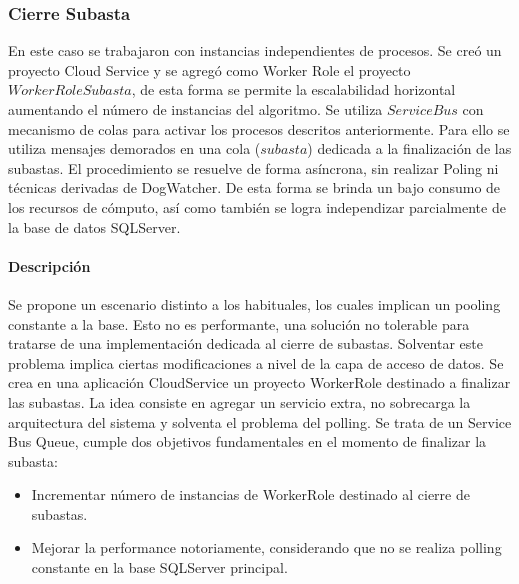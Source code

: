 \documentclass[journal]{IEEEtran}
\begin{document}
\subsubsection{Cierre Subasta}
\label{sec:cierresubasta}
En este caso se trabajaron con instancias independientes de procesos. Se creó un proyecto Cloud Service y se agregó como Worker Role el proyecto $WorkerRoleSubasta$, de esta forma se permite la escalabilidad horizontal aumentando el número de instancias del algoritmo. Se utiliza $Service Bus$ \cite{url:servicebus} con mecanismo de colas para activar los procesos descritos anteriormente. Para ello se utiliza mensajes demorados en una cola ($subasta$) dedicada a la finalización de las subastas. El procedimiento se resuelve de forma asíncrona, sin realizar Poling ni técnicas derivadas de DogWatcher. De esta forma se brinda un bajo consumo de los recursos de cómputo, así como también se logra independizar parcialmente de la base de datos SQLServer.

\paragraph{Descripción}
Se propone un escenario distinto a los habituales, los cuales implican un pooling constante a la base. Esto no es performante, una solución no tolerable para tratarse de una implementación dedicada al cierre de subastas.
Solventar este problema implica ciertas modificaciones a nivel de la capa de acceso de datos. Se crea en una aplicación CloudService \cite{url:cloudservice} un proyecto WorkerRole destinado a finalizar las subastas.
La idea consiste en agregar un servicio extra, no sobrecarga la arquitectura del sistema y solventa el problema del polling. Se trata de un Service Bus Queue, cumple dos objetivos fundamentales en el momento de finalizar la subasta:
\begin{itemize}
  \item Incrementar número de instancias de WorkerRole destinado al cierre de subastas.
  \item Mejorar la performance notoriamente, considerando que no se realiza polling constante en la base SQLServer principal.
\end{itemize}
\end{document}
